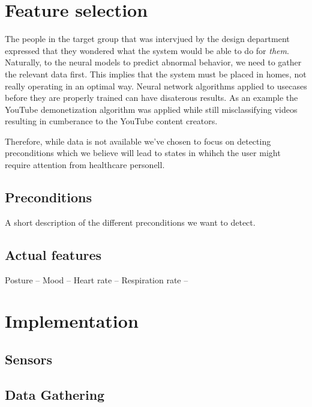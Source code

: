 \documentclass[a4paper]{report}
\begin{document}
\section{Feature selection}
The people in the target group that was intervjued by the design department expressed that they wondered what the system would be able to do for \emph{them}. Naturally, to the neural models to predict abnormal behavior, we need to gather the relevant data first. This implies that the system must be placed in homes, not really operating in an optimal way. Neural network algorithms applied to usecases before they are properly trained can have disaterous results. As an example the YouTube demonetization algorithm was applied while still misclassifying videos resulting in cumberance to the YouTube content creators.

Therefore, while data is not available we've chosen to focus on detecting preconditions which we believe will lead to states in whihch the user might require attention from healthcare personell.

\subsection{Preconditions}
A short description of the different preconditions we want to detect. 

\subsection{Actual features}
Posture -- Mood -- Heart rate -- Respiration rate --  

\section{Implementation}
\subsection{Sensors}
\subsection{Data Gathering}
\end{document}
